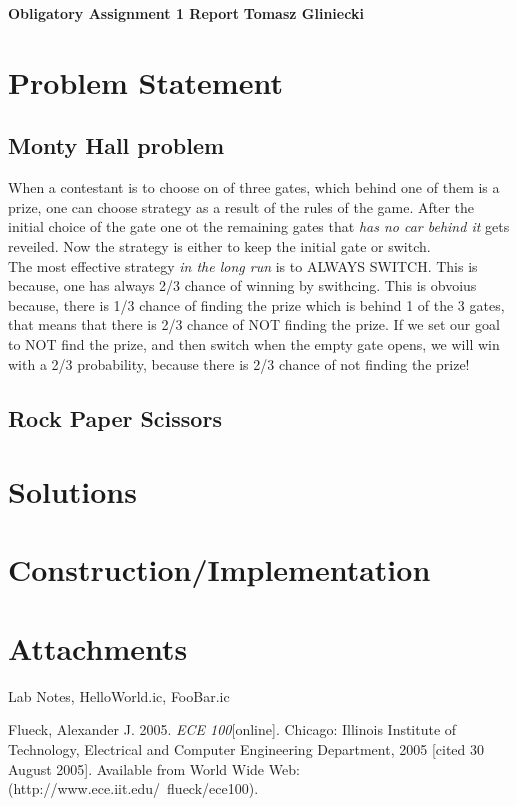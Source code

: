 \documentclass[a4paper, 11pt]{article}
\begin{document}
\noindent
\large\textbf{Obligatory Assignment 1 Report} \hfill \textbf{Tomasz Gliniecki} \\

\section*{Problem Statement}
\subsection*{Monty Hall problem}
When a contestant is to choose on of three gates, which behind one of them is a prize, one can choose strategy as a result of the rules of the game. After the initial choice of the gate one ot the remaining gates that \emph{has no car behind it} gets reveiled. Now the strategy is either to keep the initial gate or switch.\\
The most effective strategy \emph{in the long run} is to ALWAYS SWITCH. This is because, one has always 2/3 chance of winning by swithcing. This is obvoius because, there is 1/3 chance of finding the prize which is behind 1 of the 3 gates, that means that there is 2/3 chance of NOT finding the prize. If we set our goal to NOT find the prize, and then switch when the empty gate opens, we will win with a 2/3 probability, because there is 2/3 chance of not finding the prize!

\subsection*{Rock Paper Scissors}


\section*{Solutions}


\section*{Construction/Implementation}

\section*{Attachments}
Lab Notes, HelloWorld.ic, FooBar.ic

\begin{thebibliography}{9}
  
  
  Flueck, Alexander J. 2005. \emph{ECE 100}[online]. Chicago: Illinois Institute of Technology, Electrical and Computer Engineering Department, 2005 [cited 30
  August 2005]. Available from World Wide Web: (http://www.ece.iit.edu/~flueck/ece100).

\end{thebibliography}
\end{document}
